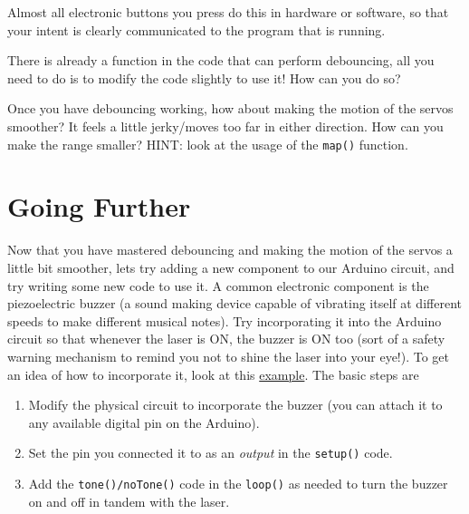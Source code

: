 \documentclass{article}
\begin{document}
Almost all electronic buttons you press do this in hardware or software, so that your
intent is clearly communicated to the program that is running.

There is already a function in the code that can perform debouncing, all you need to
do is to modify the code slightly to use it! How can you do so?

Once you have debouncing working, how about making the motion of the servos smoother?
It feels a little jerky/moves too far in either direction. How can you make the range
smaller? HINT: look at the usage of the \verb|map()| function.

\section{Going Further}
Now that you have mastered debouncing and making the motion of the servos a little
bit smoother, lets try adding a new component to our Arduino circuit, and try writing
some new code to use it. A common electronic component is the piezoelectric buzzer (a
sound making device capable of vibrating itself at different speeds to make different
musical notes). Try incorporating it into the Arduino circuit so that whenever the
laser is ON, the buzzer is ON too (sort of a safety warning mechanism to remind you
not to shine the laser into your eye!). To get an idea of how to incorporate it, look
at this
\href{https://create.arduino.cc/projecthub/SURYATEJA/use-a-buzzer-module-piezo-speaker-using-arduino-uno-89df45}{example}. The
basic steps are

\begin{enumerate}
\item Modify the physical circuit to incorporate the buzzer (you can attach it to any
  available digital pin on the Arduino).
\item Set the pin you connected it to as an \emph{output} in the \verb|setup()| code.
\item Add the \verb|tone()/noTone()| code in the \verb|loop()| as needed to turn the
  buzzer on and off in tandem with the laser.
\end{enumerate}
\end{document}
